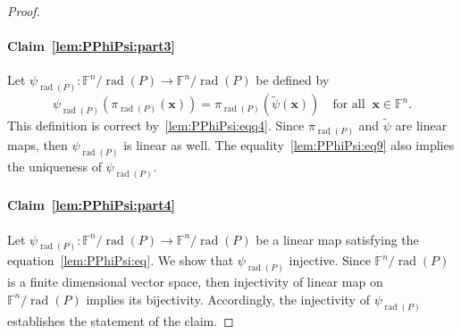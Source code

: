 \documentclass{elsarticle}
\DeclareMathOperator{\rad}{rad}
\def\F{{\mathbb F}}
\theoremstyle{definition}
\numberwithin{equation}{section}
\begin{document}
\begin{proof}
\paragraph{Claim~\ref{lem:PPhiPsi:part3}} Let $\psi_{\rad(P)} \colon \F^n / \rad(P) \to \F^n /\rad(P)$ be defined by
\begin{equation}\label{lem:PPhiPsi:eq9}
\psi_{\rad(P)} \left(\pi_{\rad(P)}(\mathbf x)\right) = \pi_{\rad(P)} \left( \tilde{\psi}(\mathbf x)\right)\quad\mbox{for all}\;\;\mathbf x \in \F^n.
\end{equation}
This definition is correct by~\eqref{lem:PPhiPsi:eqq4}. Since $\pi_{\rad(P)}$ and $\tilde{\psi}$ are linear maps, then $\psi_{\rad(P)}$ is linear as well. The equality~\eqref{lem:PPhiPsi:eq9} also implies the uniqueness of $\psi_{\rad(P)}$.

\paragraph{Claim~\ref{lem:PPhiPsi:part4}} Let $\psi_{\rad(P)} \colon \F^n / \rad(P) \to \F^n /\rad(P)$ be a linear map satisfying the equation~\eqref{lem:PPhiPsi:eq}. We show that $\psi_{\rad(P)}$ injective. Since $\F^n / \rad(P)$ is a finite dimensional vector space, then injectivity of linear map on $\F^n / \rad(P)$ implies its bijectivity. Accordingly, the injectivity of $\psi_{\rad(P)}$ establishes the statement of the claim. 


\end{proof}
\end{document}
